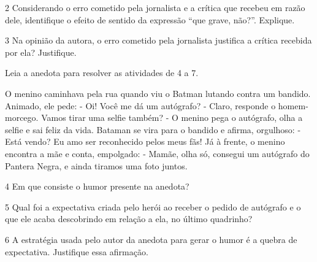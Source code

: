 \num{2} Considerando o erro cometido pela jornalista e a crítica que
recebeu em razão dele, identifique o efeito de sentido da expressão
``que grave, não?''. Explique.


\num{3} Na opinião da autora, o erro cometido pela jornalista justifica
a crítica recebida por ela? Justifique.


Leia a anedota para resolver as atividades de 4 a 7.

\begin{myquote}
O menino caminhava pela rua quando viu o Batman lutando contra um bandido. Animado, ele pede:
- Oi! Você me dá um autógrafo?
- Claro, responde o homem-morcego. Vamos tirar uma selfie também?
- O menino pega o autógrafo, olha a selfie e sai feliz da vida.
Bataman se vira para o bandido e afirma, orgulhoso:
- Está vendo? Eu amo ser reconhecido pelos meus fãs!
Já à frente, o menino encontra a mãe e conta, empolgado:
- Mamãe, olha só, consegui um autógrafo do Pantera Negra, e ainda tiramos uma foto juntos.
\end{myquote}

\num{4} Em que consiste o humor presente na anedota?


\num{5} Qual foi a expectativa criada pelo herói ao receber o pedido de
autógrafo e o que ele acaba descobrindo em relação a ela, no último
quadrinho?


\num{6} A estratégia usada pelo autor da anedota para gerar o humor é a
quebra de expectativa. Justifique essa afirmação.


